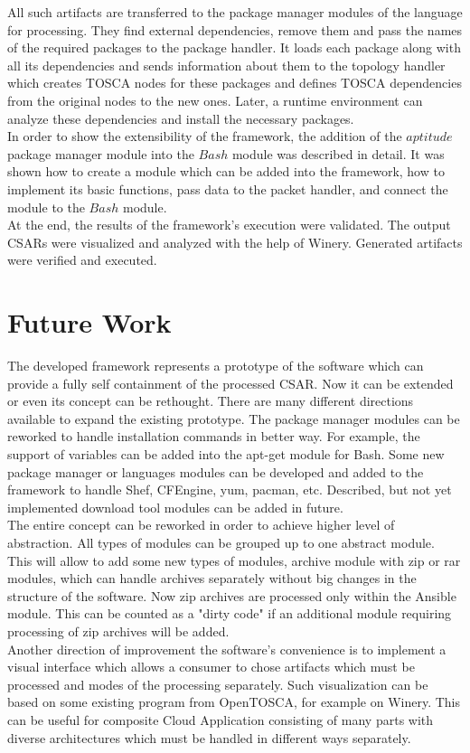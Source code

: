 All such artifacts are transferred to the package manager modules of the language for processing.
They find external dependencies, remove them and pass the names of the required packages to the package handler.
It loads each package along with all its dependencies and sends information about them to the topology handler which creates TOSCA nodes for these packages and defines TOSCA dependencies from the original nodes to the new ones.
Later, a runtime environment can analyze these dependencies and install the necessary packages.\\
In order to show the extensibility of the framework, the addition of the $aptitude$ package manager module into the $Bash$ module was described in detail.
It  was shown how to create a module which can be added into the framework, how to implement its basic functions, pass data to the packet handler, and connect the module to the $Bash$ module. \\
At the end, the results of the framework's execution were validated.
The output CSARs were visualized and analyzed with the help of Winery.
Generated artifacts were verified and executed.
\section*{Future Work}
The developed framework represents a prototype of the software which can provide a fully self containment of the processed CSAR.
Now it can be extended or even its concept can be rethought.
There are many different directions available to expand the existing prototype.
The package manager modules can be reworked to handle installation commands in better way.
For example, the support of variables can be added into the apt-get module for Bash.
Some new package manager or languages modules can be developed and added to the framework to handle Shef, CFEngine, yum, pacman, etc.
Described, but not yet implemented download tool modules can be added in future.\\
The entire concept can be reworked in order to achieve higher level of abstraction.
All types of modules can be grouped up to one abstract module.
This will allow to add some new types of modules, archive module with zip or rar modules, which can handle archives separately without big changes in the structure of the software.
Now zip archives are processed only within the Ansible module.
This can be counted as a "dirty code" if an additional module requiring  processing of zip archives will be added.\\
Another direction of improvement the software's convenience is to implement a visual interface which allows a consumer to chose artifacts which must be processed and modes of the processing separately.
Such visualization can be based on some existing program from OpenTOSCA, for example on Winery.
This can be useful for composite Cloud Application consisting of many parts with diverse architectures which must be handled in different ways separately.
